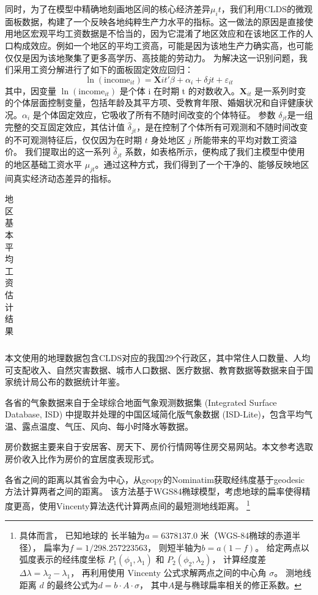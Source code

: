 \documentclass[
  a4paper,
  zihao=-4,
  fontset=mac,
  AutoFakeBold,
  AutoFakeSlant,
  oneside]{ctexbook}
\let\oldfootnote\footnote
\renewcommand{\footnote}[1]{%
  \oldfootnote{\setstretch{1.5}#1}%
}
\begin{document}
同时，为了在模型中精确地刻画地区间的核心经济差异$\mu_it$，我们利用CLDS的微观面板数据，构建了一个反映各地纯粹生产力水平的指标。这一做法的原因是直接使用地区宏观平均工资数据是不恰当的，因为它混淆了地区效应和在该地区工作的人口构成效应。例如一个地区的平均工资高，可能是因为该地生产力确实高，也可能仅仅是因为该地聚集了更多高学历、高技能的劳动力。
为解决这一识别问题，我们采用工资分解进行了如下的面板固定效应回归：
\begin{equation}
\ln(\text{income}_{it}) = \mathbf{X}{it}'\beta + \alpha_i + \delta{jt} + \varepsilon_{it}
\label{eq:wage_decomposition}
\end{equation}
其中，因变量 $\ln(\text{income}_{it})$ 是个体 i 在时期 t 的对数收入。$\mathbf{X}_{it}$ 是一系列时变的个体层面控制变量，包括年龄及其平方项、受教育年限、婚姻状况和自评健康状况。$\alpha_i$ 是个体固定效应，它吸收了所有不随时间改变的个体特征。
参数 $\delta_{jt}$是一组完整的交互固定效应，其估计值 $\hat{\delta}_{jt}$，是在控制了个体所有可观测和不随时间改变的不可观测特征后，仅仅因为在时期 $t$ 身处地区 $j$ 所能带来的平均对数工资溢价。
我们提取出的这一系列 $\hat{\delta}_{jt}$ 系数，如表格所示，便构成了我们主模型中使用的地区基础工资水平 $\mu_{jt}$。通过这种方式，我们得到了一个干净的、能够反映地区间真实经济动态差异的指标。

\begin{table}[!ht]
\centering
\caption{地区基本平均工资估计结果}
\begin{tabularx}{\textwidth}{@{}cXXX@{}}
\toprule
\midrule
\bottomrule
\end{tabularx}
\label{tab:CMDS同乡网络矩阵}
\end{table}

本文使用的地理数据包含CLDS对应的我国29个行政区，其中常住人口数量、人均可支配收入、自然灾害数据、城市人口数据、医疗数据、教育数据等数据来自于国家统计局公布的数据统计年鉴。

各省的气象数据来自于全球综合地面气象观测数据集 (Integrated Surface Database, ISD) 中提取并处理的中国区域简化版气象数据 (ISD-Lite)，包含平均气温、露点温度、气压、风向、每小时降水等数据。

房价数据主要来自于安居客、房天下、房价行情网等住房交易网站。本文参考\textcite{LiHuiFangJieFangJieShouRuBiYuLiuDongRenKouChangQiJuLiuYiYuanLaiZiLiuDongRenKouDeWeiGuanZhengJu2019}选取房价收入比作为房价的宜居度表现形式。

各省之间的距离以其省会为中心，从geopy的Nominatim获取经纬度基于geodesic方法计算两者之间的距离。
该方法基于WGS84椭球模型，考虑地球的扁率使得精度更高，使用Vincenty算法迭代计算两点间的最短测地线距离。
\footnote{
具体而言，
已知地球的
长半轴为$a = 6378137.0$ 米（WGS-84椭球的赤道半径），
扁率为$f = 1 / 298.257223563$，
则短半轴为$b = a(1 - f)$。
给定两点以弧度表示的经纬度坐标 $ P_1(\phi_1, \lambda_1) $ 和 $ P_2(\phi_2, \lambda_2) $，
计算经度差$\Delta\lambda = \lambda_2 - \lambda_1$，
再利用使用 Vincenty 公式求解两点之间的中心角 $\sigma$。
测地线距离 $d$ 的最终公式为$d = b \cdot A \cdot \sigma$，
其中$A$是与椭球扁率相关的修正系数。
}
\end{document}
